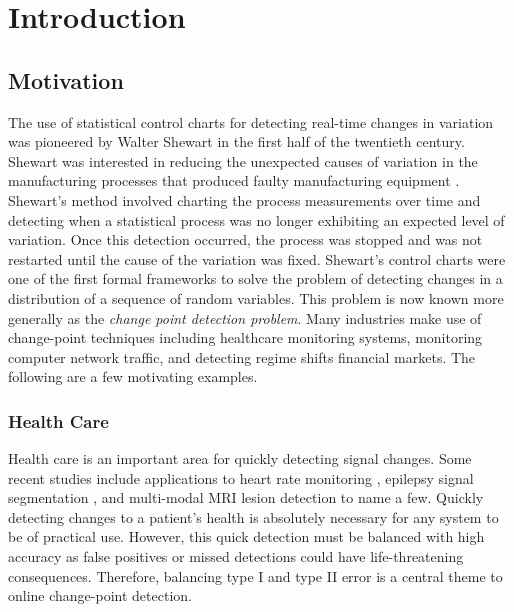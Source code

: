\chapter{Introduction}
\section{Motivation}
The use of statistical control charts for detecting real-time changes in variation was pioneered by Walter Shewart in the first half of the twentieth century.  Shewart was interested in reducing the unexpected causes of variation in the manufacturing processes that produced faulty manufacturing equipment \cite{shewhart1931economic}. Shewart's method involved charting the process measurements over time and detecting when a statistical process was no longer exhibiting an expected level of variation. Once this detection occurred, the process was stopped and was not restarted until the cause of the variation was fixed.
Shewart's control charts were one of the first formal frameworks to solve the problem of detecting changes in a distribution of a sequence of random variables. This problem is now known more generally as the \textit{change point detection problem}. Many industries make use of change-point techniques including healthcare monitoring systems, monitoring computer network traffic, and detecting regime shifts financial markets. The following are a few motivating examples.

\subsection{Health Care}
Health care is an important area for quickly detecting signal changes. Some recent studies include applications to heart rate monitoring \cite{yang2006adaptive} \cite{staudacher2005new}, epilepsy signal segmentation \cite{malladi2013online}, and multi-modal MRI lesion detection \cite{bosc2003automatic} to name a few. Quickly detecting changes to a patient's health is absolutely necessary for any system to be of practical use. However, this quick detection must be balanced with high accuracy as false positives or missed detections could have life-threatening consequences. Therefore, balancing type I and type II error is a central theme to online change-point detection.


